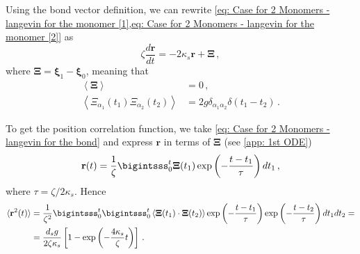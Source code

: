 \documentclass[../../main.tex]{subfiles}
\begin{document}
    Using the bond vector definition, we can rewrite \cref{eq: Case for 2 Monomers - langevin for the monomer [1],eq: Case for 2 Monomers - langevin for the monomer [2]} as
        \begin{equation}\label{eq: Case for 2 Monomers - langevin for the bond}
            \zeta \frac{d\mathbf{r}}{dt} = -2\kappa_s\mathbf{r} + \bm{\Xi} \,,
        \end{equation}
    where $\bm{\Xi} = \bm{\xi}_1 -  \bm{\xi}_0$, meaning that
        \begin{align}
            \left\langle \bm{\Xi} \right\rangle &= 0 \,,\\
            \left\langle \Xi_{\alpha_1}(t_1) \Xi_{\alpha_2}(t_2) \right\rangle &= 2g \delta_{{\alpha_1}{\alpha_2}} \delta(t_1 - t_2)\,.
        \end{align}
    
    To get the position correlation function, we take \cref{eq: Case for 2 Monomers - langevin for the bond} and express $\mathbf{r}$ in terms of $\bm{\Xi}$ (see \cref{app: 1st ODE})
        \begin{equation}
            \mathbf{r}(t) = \frac{1}{\zeta}\bigintsss_0^t \bm{\Xi}(t_1) \exp\left(-\frac{t-t_1}{\tau}\right)dt_1 \,,
        \end{equation}
    where $\tau = \zeta/2\kappa_s$. Hence
        \begin{equation}\label{eq: Case for 2 Monomers - pos corr (theory)}
        \begin{split}
            \langle \mathbf{r}^2(t) \rangle &= \frac{1}{\zeta^2}\bigintsss_0^t \bigintsss_0^t \left\langle \bm{\Xi}(t_1) \cdot \bm{\Xi}(t_2) \right\rangle \exp\left( -\frac{t-t_1}{\tau} \right) \exp\left( -\frac{t-t_2}{\tau} \right) dt_1dt_2 = \\
            &= \frac{d_s g}{2\zeta\kappa_s} \left[1 - \exp\left( -\frac{4\kappa_s}{\zeta}t \right)\right]\,.
        \end{split}
        \end{equation}
    
\end{document}
